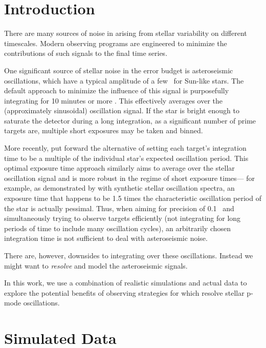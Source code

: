 \documentclass[modern]{aastex62}
\begin{document}
\section{Introduction}
\label{s:intro}

There are many sources of noise in \EPRV arising from stellar variability on different timescales. 
Modern observing programs are engineered to minimize the contributions of such signals to the final \RV time series.

One significant source of stellar noise in the \EPRV error budget is asteroseismic oscillations, which have a typical amplitude of a few \ms\ for Sun-like stars. 
The default approach to minimize the influence of this signal is purposefully integrating for 10 minutes or more \citep{Dumusque2011}. 
This effectively averages over the (approximately sinusoidal) oscillation signal. 
If the star is bright enough to saturate the detector during a long integration, as a significant number of prime \EPRV targets are, multiple short exposures may be taken and binned. 

More recently, \citet{Chaplin2019} put forward the alternative of setting each target's integration time to be a multiple of the individual star's expected oscillation period. 
This optimal exposure time approach similarly aims to average over the stellar oscillation signal and is more robust in the regime of short exposure times--- for example, as demonstrated by \citet{Chaplin2019} with synthetic stellar oscillation spectra, an exposure time that happens to be 1.5 times the characteristic oscillation period of the star is actually pessimal. 
Thus, when aiming for \RV precision of 0.1 \ms\ and simultaneously trying to observe targets efficiently (\ie not integrating for long periods of time to include many oscillation cycles), an arbitrarily chosen integration time is not sufficient to deal with asteroseismic noise.

There are, however, downsides to integrating over these oscillations. 
Instead we might want to \textit{resolve} and model the asteroseismic signals.

In this work, we use a combination of realistic simulations and actual \EXPRES data to explore the potential benefits of observing strategies for \EPRV which resolve stellar p-mode oscillations. 


\section{Simulated Data}
\end{document}
